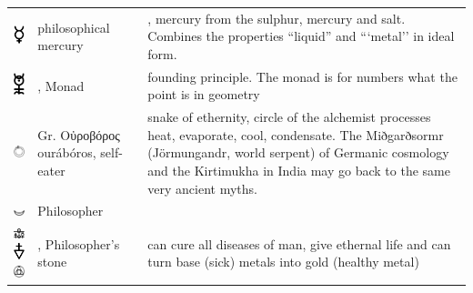 \documentclass[british,final,landscape]{scrartcl}
\begin{document}
\begin{refsection}
\begin{supertabular}{p{0.3\textwidth}p{0.34\textwidth}p{0.34\textwidth}}
  \includegraphics[width=5mm]{Concepts/Mercury} & philosophical mercury & , mercury from the  sulphur, mercury and salt. Combines the properties ``liquid'' and ```metal'' in ideal form. \\
  \includegraphics[width=5mm]{Concepts/Monad} & ,  Monad & founding principle. The monad is for numbers what the point is in geometry \parencite{Dee-64}\\
  \includegraphics[width=10mm]{Concepts/Ouroboros} & Gr. \foreignlanguage{greek}{Οὐροβόρος} ourábóros, self-eater & snake of ethernity, circle of the alchemist processes heat, evaporate, cool, condensate. The Miðgarðsormr (Jörmungandr, world serpent) of Germanic cosmology and the Kirtimukha in India may go back to the same very ancient myths. \\
  \includegraphics[width=5mm]{Concepts/Philosopher} & Philosopher & \\
  \includegraphics[width=5mm]{Concepts/PhilosophersStone} \includegraphics[width=5mm]{Concepts/PhilosophersStone2} \includegraphics[width=5mm]{Concepts/PhilosophersStone3} & , Philosopher's stone & can cure all diseases of man, give ethernal life and can turn base (sick) metals into gold (healthy metal) \\

\end{supertabular}
\end{refsection}
\end{document}
